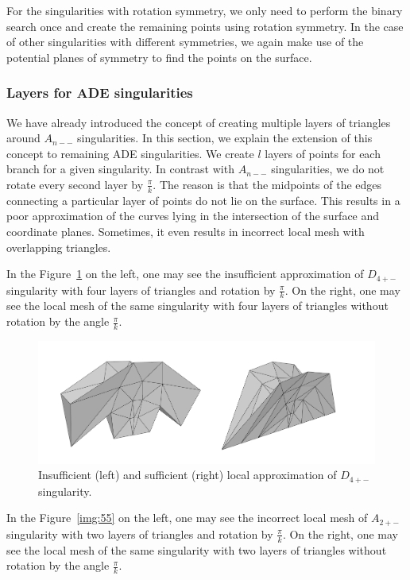 For the singularities with rotation
symmetry, we only need to perform the binary search once and create the remaining 
points using rotation symmetry.
In the case of other singularities with different symmetries, we again make use of the
potential planes of symmetry to find the points on the surface.

\subsubsection*{Layers for ADE singularities}
We have already introduced the concept of creating multiple layers of triangles around
$A_{n--}$ singularities. In this section, we explain the extension of this concept
to remaining ADE singularities. We create $l$ layers of
points for each branch for a given singularity. In contrast with $A_{n--}$ singularities, we do not 
rotate every second layer by $\frac{\pi}{k}$. The reason is that the midpoints of
the edges connecting a particular layer of points do not lie on the surface. This results
in a poor approximation of the curves lying in the intersection of the surface 
and coordinate planes. Sometimes, it even results in incorrect local mesh with 
overlapping triangles.

In the Figure~\ref{img:56} on the left, one may see the insufficient approximation
of $D_{4+-}$ singularity with
four layers of triangles and rotation by $\frac{\pi}{k}$. On the right, one
may see the local mesh of the same singularity with four layers of triangles
without rotation by the angle $\frac{\pi}{k}$.

\begin{figure}
    \centerline{\includegraphics[scale=0.4]{images/img56}}
    \caption[Insufficient and sufficient local approximation]
    {Insufficient (left) and sufficient (right) local approximation of $D_{4+-}$ singularity.}
    \label{img:56}
\end{figure}

In the Figure~\ref{img:55} on the left, one may see the incorrect local mesh
of $A_{2+-}$ singularity with
two layers of triangles and rotation by $\frac{\pi}{k}$. On the right, one
may see the local mesh of the same singularity with two layers of triangles
without rotation by the angle $\frac{\pi}{k}$.

